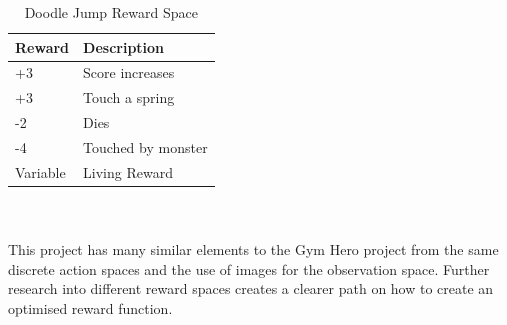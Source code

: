 \documentclass[a4paper,12pt]{article}
\begin{document}
\begin{table}[H]
\centering
\caption{Doodle Jump Reward Space}
\label{tab:Doodle Jump Reward Space}
\begin{tabular}{|ll|}
\hline
\textbf{Reward} & \textbf{Description}\\ \hline
+3 & Score increases \\ 
+3 & Touch a spring \\ 
-2 & Dies \\ 
-4 & Touched by monster \\ 
 Variable & Living Reward \\ \hline
\end{tabular}
\end{table}
\\\\
This project has many similar elements to the Gym Hero project from the same discrete action spaces and the use of images for the observation space. Further research into different reward spaces creates a clearer path on how to create an optimised reward function.
\\\\
\end{document}

